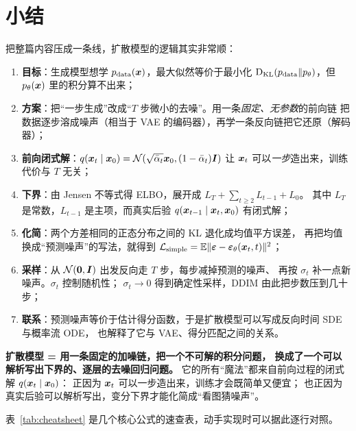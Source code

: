 \section{小结}

把整篇内容压成一条线，扩散模型的逻辑其实非常顺：

\begin{enumerate}
  \item \textbf{目标}：生成模型想学 $p_{\text{data}}(\bm{x})$，最大似然等价于最小化
        $\mathrm{D}_{\mathrm{KL}}(p_{\text{data}}\|p_\theta)$，但 $p_\theta(\bm{x})$ 里的积分算不出来；
  \item \textbf{方案}：把“一步生成”改成“$T$ 步微小的去噪”。用一条\emph{固定、无参数}的前向链
        把数据逐步溶成噪声（相当于 VAE 的编码器），再学一条反向链把它还原（解码器）；
  \item \textbf{前向闭式解}：$q(\bm{x}_t\mid\bm{x}_0)=\mathcal{N}(\sqrt{\bar{\alpha}_t}\bm{x}_0,(1-\bar{\alpha}_t)\bm{I})$
        让 $\bm{x}_t$ 可以\emph{一步}造出来，训练代价与 $T$ 无关；
  \item \textbf{下界}：由 Jensen 不等式得 ELBO，展开成 $L_T+\sum_{t\ge2}L_{t-1}+L_0$。
        其中 $L_T$ 是常数，$L_{t-1}$ 是主项，而真实后验
        $q(\bm{x}_{t-1}\mid\bm{x}_t,\bm{x}_0)$ 有闭式解；
  \item \textbf{化简}：两个方差相同的正态分布之间的 KL 退化成均值平方误差，
        再把均值换成“预测噪声”的写法，就得到
        $\mathcal{L}_{\text{simple}}=\mathbb{E}\|\bm{\varepsilon}-\bm{\varepsilon}_\theta(\bm{x}_t,t)\|^2$；
  \item \textbf{采样}：从 $\mathcal{N}(\bm{0},\bm{I})$ 出发反向走 $T$ 步，每步减掉预测的噪声、
        再按 $\sigma_t$ 补一点新噪声。$\sigma_t$ 控制随机性；
        $\sigma_t\to0$ 得到确定性采样，DDIM 由此把步数压到几十步；
  \item \textbf{联系}：预测噪声等价于估计得分函数，于是扩散模型可以写成反向时间 SDE 与概率流 ODE，
        也解释了它与 VAE、得分匹配之间的关系。
\end{enumerate}

\begin{keybox}[一句话]
\textbf{扩散模型 = 用一条固定的加噪链，把一个不可解的积分问题，
换成了一个可以解析写出下界的、逐层的去噪回归问题。}
它的所有“魔法”都来自前向过程的闭式解 $q(\bm{x}_t\mid\bm{x}_0)$：
正因为 $\bm{x}_t$ 可以一步造出来，训练才会既简单又便宜；
也正因为真实后验可以解析写出，变分下界才能化简成“看图猜噪声”。
\end{keybox}

表~\ref{tab:cheatsheet} 是几个核心公式的速查表，动手实现时可以据此逐行对照。

